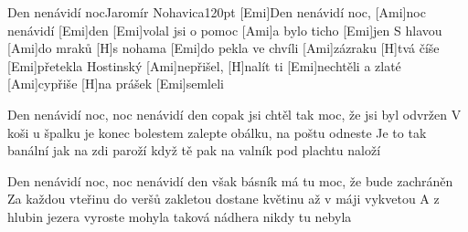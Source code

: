 \begin{song}{Den nenávidí noc}{Jaromír Nohavica}{120pt}
%
[Emi]Den nenávidí noc, [Ami]noc nenávidí [Emi]den
[Emi]volal jsi o pomoc [Ami]a bylo ticho [Emi]jen
S hlavou [Ami]do mraků [H]s nohama [Emi]do pekla
ve chvíli [Ami]zázraku [H]tvá číše [Emi]přetekla
\rl Hostinský [Ami]nepřišel, [H]nalít ti [Emi]nechtěli
a zlaté [Ami]cypřiše [H]na prášek [Emi]semleli\rr{}

%
Den nenávidí noc, noc nenávidí den
copak jsi chtěl tak moc, že jsi byl odvržen
V koši u špalku je konec bolestem
zalepte obálku, na poštu odneste
\rl Je to tak banální jak na zdi paroží
když tě pak na valník pod plachtu naloží\rr{}

%
Den nenávidí noc, noc nenávidí den
však básník má tu moc, že bude zachráněn
Za každou vteřinu do veršů zakletou
dostane květinu až v máji vykvetou
\rl A z hlubin jezera vyroste mohyla
taková nádhera nikdy tu nebyla\rr{}
\end{song}
